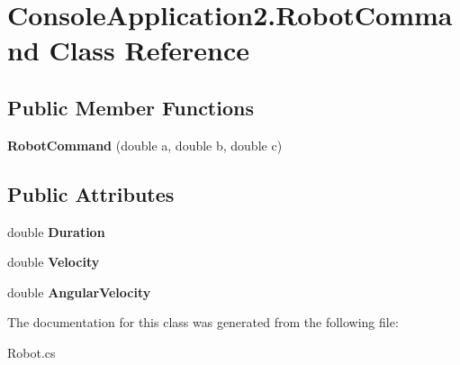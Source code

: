 \hypertarget{class_console_application2_1_1_robot_command}{}\section{Console\+Application2.\+Robot\+Command Class Reference}
\label{class_console_application2_1_1_robot_command}
\subsection*{Public Member Functions}
\begin{DoxyCompactItemize}
\item 
\hypertarget{class_console_application2_1_1_robot_command_a45b4b7c8797f4ceda8ce649d252068ec}{}{\bfseries Robot\+Command} (double a, double b, double c)\label{class_console_application2_1_1_robot_command_a45b4b7c8797f4ceda8ce649d252068ec}

\end{DoxyCompactItemize}
\subsection*{Public Attributes}
\begin{DoxyCompactItemize}
\item 
\hypertarget{class_console_application2_1_1_robot_command_a8eb65492e367840067d65708156119cc}{}double {\bfseries Duration}\label{class_console_application2_1_1_robot_command_a8eb65492e367840067d65708156119cc}

\item 
\hypertarget{class_console_application2_1_1_robot_command_a1626bf1f48b38046fb9c3a1294b1730e}{}double {\bfseries Velocity}\label{class_console_application2_1_1_robot_command_a1626bf1f48b38046fb9c3a1294b1730e}

\item 
\hypertarget{class_console_application2_1_1_robot_command_a176b5beecd4a6b844ffcd44e3feee7f9}{}double {\bfseries Angular\+Velocity}\label{class_console_application2_1_1_robot_command_a176b5beecd4a6b844ffcd44e3feee7f9}

\end{DoxyCompactItemize}


The documentation for this class was generated from the following file\+:\begin{DoxyCompactItemize}
\item 
Robot.\+cs\end{DoxyCompactItemize}

